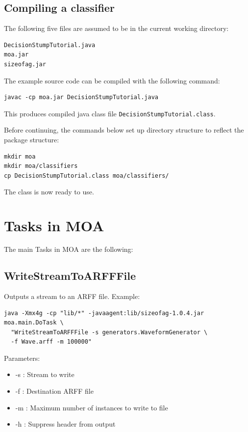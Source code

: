 \documentclass[a4paper,12pt,twoside]{book}
\begin{document}
\section{Compiling a classifier}

The following five files are assumed to be in the current working directory:

\begin{verbatim}
DecisionStumpTutorial.java
moa.jar
sizeofag.jar
\end{verbatim}

The example source code can be compiled with the following command:

\begin{verbatim}
javac -cp moa.jar DecisionStumpTutorial.java
\end{verbatim}

This produces compiled java class file \verb+DecisionStumpTutorial.class+.

Before continuing, the commands below set up directory structure to reflect the package structure:

\begin{verbatim}
mkdir moa
mkdir moa/classifiers
cp DecisionStumpTutorial.class moa/classifiers/
\end{verbatim}

The class is now ready to use.



\chapter{Tasks in MOA}

The main Tasks in MOA are the following:



\section{WriteStreamToARFFFile} 

Outputs a stream to an ARFF file. 
Example:
\begin{footnotesize}\begin{verbatim}
java -Xmx4g -cp "lib/*" -javaagent:lib/sizeofag-1.0.4.jar moa.main.DoTask \
  "WriteStreamToARFFFile -s generators.WaveformGenerator \
  -f Wave.arff -m 100000" 
\end{verbatim}\end{footnotesize}

Parameters:
\begin{itemize}
\item -s : Stream to write
\item -f : Destination ARFF file
\item -m : Maximum number of instances to write to file
\item -h : Suppress header from output\end{itemize}
\end{document}
